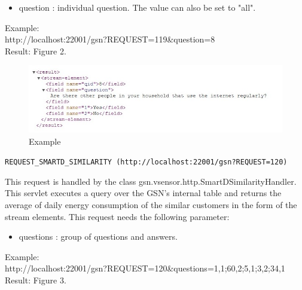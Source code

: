 \documentclass[12pt]{article}
\begin{document}
\begin{itemize}
  \item question : individual question. The value can also be set to "all".
\end{itemize}
      
Example:  \\
  
http://localhost:22001/gsn?REQUEST=119\&question=8\\

Result: Figure 2.

\begin{figure}[ht!]
		\centering
			\includegraphics{REQUEST_SMARTD_QUESTION.JPG}
		\caption{Example}
\end{figure}



\vspace{1cm}

\texttt{REQUEST\_SMARTD\_SIMILARITY (http://localhost:22001/gsn?REQUEST=120)}

\vspace{0.5cm}

This request is handled by the class gsn.vsensor.http.SmartDSimilarityHandler. This servlet executes a query over the GSN's internal table and returns the average of daily energy consumption of the similar customers in the form of the stream elements. This request needs the following parameter: 

\begin{itemize}
  \item questions : group of questions and answers. 
\end{itemize}
      
Example:  \\
  
http://localhost:22001/gsn?REQUEST=120\&questions=1,1;60,2;5,1;3,2;34,1\\

Result: Figure 3.
\end{document}
